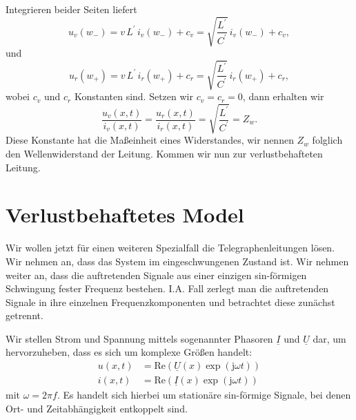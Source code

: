 \documentclass[paper=a4, parskip=half-, ngerman, fontsize=11pt]{scrreprt}
\begin{document}
Integrieren beider Seiten liefert
\begin{equation}
    u_{v}(w_{-}) = v \, L^{\prime} \, i_{v}(w_{-}) + c_{v} = \sqrt{\frac{L^{\prime}}{C^{\prime}}} \, i_{v}(w_{-}) +
    c_{v},
\end{equation}
und
\begin{equation}
    u_{r}(w_{+}) = v \, L^{\prime} \, i_{r}(w_{+}) + c_{r} = \sqrt{\frac{L^{\prime}}{C^{\prime}}} \, i_{r}(w_{+}) +
    c_{r},
\end{equation}
wobei $c_{v}$ und $c_{r}$ Konstanten sind. Setzen wir $c_{v} = c_{r} = 0$, dann erhalten wir
\begin{equation}
    \frac{u_{v}(x, t)}{i_{v}(x, t)} = \frac{u_{r}(x, t)}{i_{r}(x, t)} = \sqrt{\frac{L^{\prime}}{C^{\prime}}} = Z_{w}.
\end{equation}
Diese Konstante hat die Maßeinheit eines Widerstandes, wir nennen $Z_{w}$ folglich den Wellenwiderstand der Leitung.
Kommen wir nun zur verlustbehafteten Leitung.

\section{Verlustbehaftetes Model}
Wir wollen jetzt für einen weiteren Spezialfall die Telegraphenleitungen lösen. Wir nehmen an, dass das System im
eingeschwungenen Zustand ist. Wir nehmen weiter an, dass die auftretenden Signale aus einer einzigen sin-förmigen
Schwingung fester Frequenz bestehen. I.A. Fall zerlegt man die auftretenden Signale in ihre einzelnen
Frequenzkomponenten und betrachtet diese zunächst getrennt.

Wir stellen Strom und Spannung mittels sogenannter Phasoren $\underline{I}$ und $\underline{U}$ dar, um hervorzuheben,
dass es sich um komplexe Größen handelt:
\begin{align}
    u(x, t) &= \mathrm{Re} \left( \underline{U}(x) \exp(\mathrm{j} \omega t) \right) \label{eq:Spannung} \\
    i(x, t) &= \mathrm{Re} \left( \underline{I}(x) \exp(\mathrm{j} \omega t) \right)
\end{align}
mit $\omega = 2 \pi f$. Es handelt sich hierbei um stationäre sin-förmige Signale, bei denen Ort- und Zeitabhängigkeit
entkoppelt sind.
\end{document}
